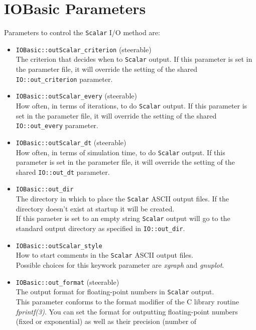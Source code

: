 \documentclass{article}
\begin{document}
\section{{\bf IOBasic} Parameters}
%
Parameters to control the {\tt Scalar} I/O method are:
\begin{itemize}
  \item {\tt IOBasic::outScalar\_criterion} (steerable)\\
        The criterion that decides when to {\tt Scalar} output.  If
        this parameter is set in the parameter file, it will override
        the setting of the shared {\tt IO::out\_criterion} parameter.
  \item {\tt IOBasic::outScalar\_every} (steerable)\\
        How often, in terms of iterations, to do {\tt Scalar} output.
        If this parameter is set in the
        parameter file, it will override the setting of the shared
        {\tt IO::out\_every} parameter.
  \item {\tt IOBasic::outScalar\_dt} (steerable)\\
        How often, in terms of simulation time, to do {\tt Scalar}
        output.  If this parameter is set in the parameter file, it
        will override the setting of the shared {\tt IO::out\_dt}
        parameter.
  \item {\tt IOBasic::out\_dir}\\
        The directory in which to place the {\tt Scalar} ASCII output files.
        If the directory doesn't exist at startup it will be created.\\
        If this paraeter is set to an empty string {\tt Scalar} output will go
        to the standard output directory as specified in {\tt IO::out\_dir}.
  \item {\tt IOBasic::outScalar\_style}\\
        How to start comments in the {\tt Scalar} ASCII output files.\\
        Possible choices for this keywork parameter are {\it xgraph} and
        {\it gnuplot}.
  \item {\tt IOBasic::out\_format} (steerable)\\
        The output format for floating-point numbers in {\tt Scalar} output.\\
        This parameter conforms to the format modifier of the C library routine
        {\it fprintf(3)}. You can set the format for outputting floating-point
        numbers (fixed or exponential) as well as their precision (number of

\end{itemize}
\end{document}
